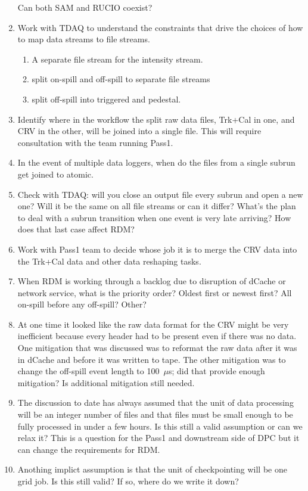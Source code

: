 \begin{enumerate}
  Can both SAM and RUCIO coexist?
\item Work with TDAQ to understand the constraints that drive the choices of how to
  map data streams to file streams.
  \begin{enumerate}
    \item A separate file stream for the intensity stream.
    \item split on-spill and off-spill to separate file streams
    \item split off-spill into triggered and pedestal.
  \end{enumerate}
\item Identify where in the workflow the split raw data files, Trk+Cal in one,
  and CRV in the other, will be joined into a single file.  This will require consultation with the team running
  Pass1.
\item In the event of multiple data loggers, when do the files from a single subrun get joined to atomic.
\item Check with TDAQ: will you close an output file every subrun and open a new one? Will it be the same
  on all file streams or can it differ?  What's the plan to deal with a subrun transition when one
  event is very late arriving?  How does that last case affect RDM?
\item Work with Pass1 team to decide whose job it is to merge the CRV data into the Trk+Cal data and other
     data reshaping tasks.
\item When RDM is working through a backlog due to disruption of dCache or network service, what is the priority
  order?  Oldest first or newest first?  All on-spill before any off-spill?  Other?
\item At one time it looked like the raw data format for the CRV might be very inefficient
  because every header had to be present even if there was no data.
  One mitigation that was discussed was to reformat the raw data after it was in dCache and before it was written to tape.
  The other mitigation was to change the off-spill event length to 100~$\mu$s; did that provide enough mitigation?
  Is additional mitigation still needed.
\item The discussion to date has always assumed that the unit of data processing will be an integer number of files
  and that files must be small enough to be fully processed in under a few hours.  Is this still a valid assumption
  or can we relax it?  This is a question for the Pass1 and downstream side of DPC but it can change the requirements for RDM.
\item Anothing implict assumption is that the unit of checkpointing will be one grid job. Is this still valid?
  If so, where do we write it down?
\end{enumerate}


